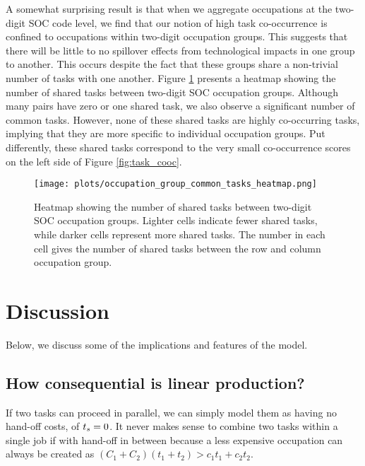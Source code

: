 \documentclass{article}
\theoremstyle{plain}
\theoremstyle{plain}
\begin{document}
A somewhat surprising result is that when we aggregate occupations at the two-digit SOC code level, we find that our notion of high task co-occurrence is confined to occupations within two-digit occupation groups. 
This suggests that there will be little to no spillover effects from technological impacts in one group to another.
This occurs despite the fact that these groups share a non-trivial number of tasks with one another. 
Figure \ref{fig:occ_gp_task_heatmap} presents a heatmap showing the number of shared tasks between two-digit SOC occupation groups. 
Although many pairs have zero or one shared task, we also observe a significant number of common tasks. 
However, none of these shared tasks are highly co-occurring tasks, implying that they are more specific to individual occupation groups.
Put differently, these shared tasks correspond to the very small co-occurrence scores on the left side of Figure \ref{fig:task_cooc}.

\begin{figure}[htbp]
  \centering
  \texttt{[image: plots/occupation\_group\_common\_tasks\_heatmap.png]}
  \caption{Heatmap showing the number of shared tasks between two-digit SOC occupation groups. Lighter cells indicate fewer shared tasks, while darker cells represent more shared tasks. The number in each cell gives the number of shared tasks between the row and column occupation group.}
  \label{fig:occ_gp_task_heatmap}
\end{figure}


\section{Discussion}
Below, we discuss some of the implications and features of the model. 

\subsection{How consequential is linear production?}
If two tasks can proceed in parallel, we can simply model them as having no hand-off costs, of $t_{s} = 0$.
It never makes sense to combine two tasks within a single job if with hand-off in between because a less expensive occupation can always be created as $(C_1 + C_2) (t_1 + t_2) > c_1 t_1 + c_2 t_2$.
\end{document}
